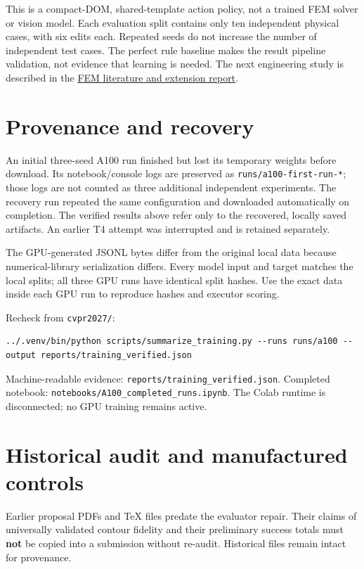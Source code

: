\documentclass[
  11pt,
  a4paper,
]{article}
\begin{document}
This is a compact-DOM, shared-template action policy, not a trained FEM
solver or vision model. Each evaluation split contains only ten
independent physical cases, with six edits each. Repeated seeds do not
increase the number of independent test cases. The perfect rule baseline
makes the result pipeline validation, not evidence that learning is
needed. The next engineering study is described in the
\href{../../reports/FEM_LITERATURE_AND_EXTENSION.md}{FEM literature and
extension report}.

\section{Provenance and recovery}\label{provenance-and-recovery}

An initial three-seed A100 run finished but lost its temporary weights
before download. Its notebook/console logs are preserved as
\texttt{runs/a100-first-run-*}; those logs are not counted as three
additional independent experiments. The recovery run repeated the same
configuration and downloaded automatically on completion. The verified
results above refer only to the recovered, locally saved artifacts. An
earlier T4 attempt was interrupted and is retained separately.

The GPU-generated JSONL bytes differ from the original local data
because numerical-library serialization differs. Every model input and
target matches the local splits; all three GPU runs have identical split
hashes. Use the exact data inside each GPU run to reproduce hashes and
executor scoring.

Recheck from \texttt{cvpr2027/}:

\begin{verbatim}
../.venv/bin/python scripts/summarize_training.py --runs runs/a100 --output reports/training_verified.json
\end{verbatim}

Machine-readable evidence: \nolinkurl{reports/training_verified.json}.
Completed notebook: \nolinkurl{notebooks/A100_completed_runs.ipynb}. The
Colab runtime is disconnected; no GPU training remains active.

\section{Historical audit and manufactured
controls}\label{historical-audit-and-manufactured-controls}

Earlier proposal PDFs and TeX files predate the evaluator repair. Their
claims of universally validated contour fidelity and their preliminary
success totals must \textbf{not} be copied into a submission without
re-audit. Historical files remain intact for provenance.
\end{document}
